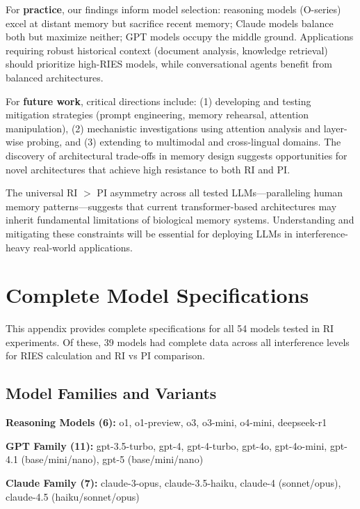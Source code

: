 \documentclass{article}
\begin{document}
For \textbf{practice}, our findings inform model selection: reasoning models (O-series) excel at distant memory but sacrifice recent memory; Claude models balance both but maximize neither; GPT models occupy the middle ground. Applications requiring robust historical context (document analysis, knowledge retrieval) should prioritize high-RIES models, while conversational agents benefit from balanced architectures.

For \textbf{future work}, critical directions include: (1) developing and testing mitigation strategies (prompt engineering, memory rehearsal, attention manipulation), (2) mechanistic investigations using attention analysis and layer-wise probing, and (3) extending to multimodal and cross-lingual domains. The discovery of architectural trade-offs in memory design suggests opportunities for novel architectures that achieve high resistance to both RI and PI.

The universal RI $>$ PI asymmetry across all tested LLMs---paralleling human memory patterns---suggests that current transformer-based architectures may inherit fundamental limitations of biological memory systems. Understanding and mitigating these constraints will be essential for deploying LLMs in interference-heavy real-world applications.

\appendix

\section{Complete Model Specifications}
\label{appendix:models}

This appendix provides complete specifications for all 54 models tested in RI experiments. Of these, 39 models had complete data across all interference levels for RIES calculation and RI vs PI comparison.

\subsection{Model Families and Variants}

\textbf{Reasoning Models (6):} o1, o1-preview, o3, o3-mini, o4-mini, deepseek-r1

\textbf{GPT Family (11):} gpt-3.5-turbo, gpt-4, gpt-4-turbo, gpt-4o, gpt-4o-mini, gpt-4.1 (base/mini/nano), gpt-5 (base/mini/nano)

\textbf{Claude Family (7):} claude-3-opus, claude-3.5-haiku, claude-4 (sonnet/opus), claude-4.5 (haiku/sonnet/opus)
\end{document}
